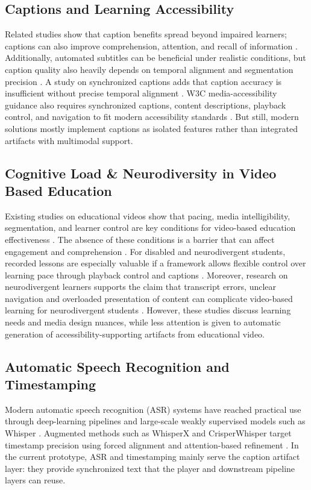 \documentclass[conference]{IEEEtran}
\begin{document}
\subsection{Captions and Learning Accessibility}
Related studies show that caption benefits spread beyond impaired learners; captions can also improve comprehension, attention, and recall of information \cite{Gernsbacher2015}. Additionally, automated subtitles can be beneficial under realistic conditions, but caption quality also heavily depends on temporal alignment and segmentation precision \cite{Malakul2023}. A study on synchronized captions adds that caption accuracy is insufficient without precise temporal alignment \cite{Mirzaei2018}. W3C media-accessibility guidance also requires synchronized captions, content descriptions, playback control, and navigation to fit modern accessibility standards \cite{W3CMediaReqs}. But still, modern solutions mostly implement captions as isolated features rather than integrated artifacts with multimodal support.

\subsection{Cognitive Load \& Neurodiversity in Video Based Education}
Existing studies on educational videos show that pacing, media intelligibility, segmentation, and learner control are key conditions for video-based education effectiveness \cite{Lange2020}. The absence of these conditions is a barrier that can affect engagement and comprehension \cite{Lange2020}. For disabled and neurodivergent students, recorded lessons are especially valuable if a framework allows flexible control over learning pace through playback control and captions \cite{Horlin2024}. Moreover, research on neurodivergent learners supports the claim that transcript errors, unclear navigation and overloaded presentation of content can complicate video-based learning for neurodivergent students \cite{LeCunff2024}. However, these studies discuss learning needs and media design nuances, while less attention is given to automatic generation of accessibility-supporting artifacts from educational video.

\subsection{Automatic Speech Recognition and Timestamping}
Modern automatic speech recognition (ASR) systems have reached practical use through deep-learning pipelines \cite{Malik2020} and large-scale weakly supervised models such as Whisper \cite{Radford2022}. Augmented methods such as WhisperX and CrisperWhisper target timestamp precision using forced alignment and attention-based refinement \cite{Bain2023,Wagner2024}. In the current prototype, ASR and timestamping mainly serve the caption artifact layer: they provide synchronized text that the player and downstream pipeline layers can reuse.
\end{document}

